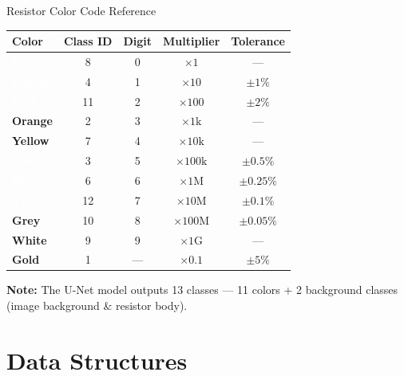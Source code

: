 \documentclass[aspectratio=169, 11pt]{beamer}
\begin{document}
\begin{frame}{Resistor Color Code Reference}
\centering
\small
\renewcommand{\arraystretch}{1.15}
\begin{tabular}{>{\centering}m{1.2cm} c c c c}
\toprule
\textbf{Color} & \textbf{Class ID} & \textbf{Digit} & \textbf{Multiplier} & \textbf{Tolerance} \\
\midrule
\cellcolor{bandblack!80}\textcolor{white}{\textbf{Black}} & 8 & 0 & $\times 1$ & --- \\
\cellcolor{bandbrown!70}\textcolor{white}{\textbf{Brown}} & 4 & 1 & $\times 10$ & $\pm 1\%$ \\
\cellcolor{bandred!70}\textcolor{white}{\textbf{Red}} & 11 & 2 & $\times 100$ & $\pm 2\%$ \\
\cellcolor{bandorange!70}\textbf{Orange} & 2 & 3 & $\times 1\text{k}$ & --- \\
\cellcolor{bandyellow!70}\textbf{Yellow} & 7 & 4 & $\times 10\text{k}$ & --- \\
\cellcolor{bandgreen!70}\textcolor{white}{\textbf{Green}} & 3 & 5 & $\times 100\text{k}$ & $\pm 0.5\%$ \\
\cellcolor{bandblue!70}\textcolor{white}{\textbf{Blue}} & 6 & 6 & $\times 1\text{M}$ & $\pm 0.25\%$ \\
\cellcolor{bandviolet!70}\textcolor{white}{\textbf{Violet}} & 12 & 7 & $\times 10\text{M}$ & $\pm 0.1\%$ \\
\cellcolor{bandgrey!70}\textbf{Grey} & 10 & 8 & $\times 100\text{M}$ & $\pm 0.05\%$ \\
\cellcolor{bandwhite}\textbf{White} & 9 & 9 & $\times 1\text{G}$ & --- \\
\cellcolor{bandgold!70}\textbf{Gold} & 1 & --- & $\times 0.1$ & $\pm 5\%$ \\
\bottomrule
\end{tabular}

\vspace{0.3cm}
{\footnotesize \textbf{Note:} The U-Net model outputs 13 classes --- 11 colors + 2 background classes (image background \& resistor body).}
\end{frame}

\section{Data Structures}
\end{document}
